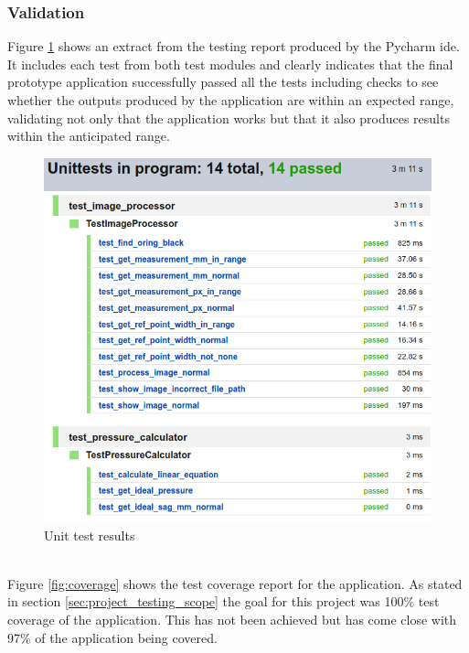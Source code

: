 		\subsubsection{Validation}\label{sec:evaluation_validation}
			Figure \ref{fig:test_results} shows an extract from the testing report produced by the Pycharm \gls{ide}. It includes each test from both test modules and clearly indicates that the final prototype application successfully passed all the tests including checks to see whether the outputs produced by the application are within an expected range, validating not only that the application works but that it also produces results within the anticipated range.
			\begin{figure}[h!]
				\centering
				\includegraphics[scale=0.5]{../images/results/test_results.png}
				\caption{Unit test results}
				\label{fig:test_results}
			\end{figure}\\
			Figure \ref{fig:coverage} shows the test coverage report for the application. As stated in section \ref{sec:project_testing_scope} the goal for this project was 100\% test coverage of the application. This has not been achieved but has come close with 97\% of the application being covered. 
			\\\\
